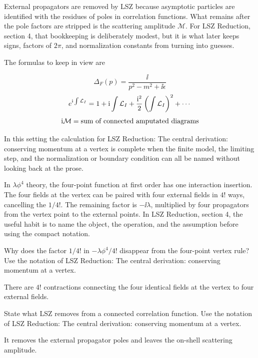 External propagators are removed by LSZ because asymptotic particles are identified with the residues of poles in correlation functions.  What remains after the pole factors are stripped is the scattering amplitude \(\mathcal M\).  For LSZ Reduction, section 4, that bookkeeping is deliberately modest, but it is what later keeps signs, factors of \(2\pi\), and normalization constants from turning into guesses.

The formulas to keep in view are

\[
  \Delta_F(p)=\frac{\ii}{p^2-m^2+\ii\epsilon}
\]
\[
  e^{\mathrm i\int\mathcal L_I}=1+\mathrm i\int\mathcal L_I+\frac{\mathrm i^2}{2}\left(\int\mathcal L_I\right)^2+\cdots
\]
\[
  \mathrm i\mathcal M=\hbox{sum of connected amputated diagrams}
\]

In this setting the calculation for LSZ Reduction: The central derivation: conserving momentum at a vertex is complete when the finite model, the limiting step, and the normalization or boundary condition can all be named without looking back at the prose.




\begin{example}
In \(\lambda\phi^4\) theory, the four-point function at first order has one interaction insertion.  The four fields at the vertex can be paired with four external fields in \(4!\) ways, cancelling the \(1/4!\).  The remaining factor is \(-\ii\lambda\), multiplied by four propagators from the vertex point to the external points.  In LSZ Reduction, section 4, the useful habit is to name the object, the operation, and the assumption before using the compact notation.
\end{example}



\begin{exercise}
Why does the factor \(1/4!\) in \(-\lambda\phi^4/4!\) disappear from the four-point vertex rule?  Use the notation of LSZ Reduction: The central derivation: conserving momentum at a vertex.
\begin{answer}
There are \(4!\) contractions connecting the four identical fields at the vertex to four external fields.
\end{answer}
\end{exercise}

\begin{exercise}
State what LSZ removes from a connected correlation function.  Use the notation of LSZ Reduction: The central derivation: conserving momentum at a vertex.
\begin{answer}
It removes the external propagator poles and leaves the on-shell scattering amplitude.
\end{answer}
\end{exercise}



